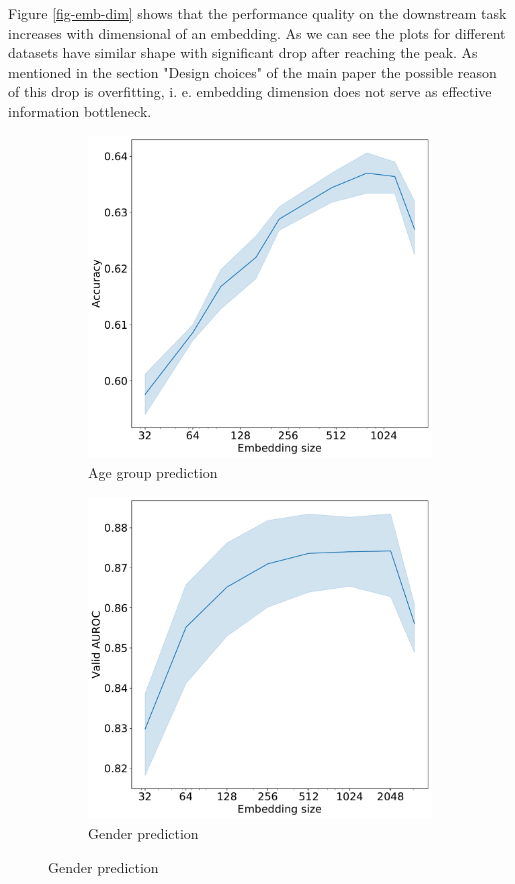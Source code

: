 \documentclass{article}
\begin{document}
Figure \ref{fig-emb-dim} shows that the performance quality on the downstream task increases with dimensional of an embedding. As we can see the plots for different datasets have similar shape with significant drop after reaching the peak. As mentioned in the section "Design choices" of the main paper the possible reason of this drop is overfitting, i. e. embedding dimension does not serve as effective information bottleneck.

\begin{figure}
  \centering
  \caption{Embedding dimensionality vs. quality}
  \begin{subfigure}{0.5\linewidth}
    \caption{Age group prediction}
    \includegraphics[width=\linewidth]{figures/age-pred-hidden-size.pdf}
  \end{subfigure}%
  \begin{subfigure}{0.5\linewidth}
    \caption{Gender prediction}
    \includegraphics[width=\linewidth]{figures/gender-hidden-size.pdf}

\end{subfigure}
\end{figure}
\end{document}

